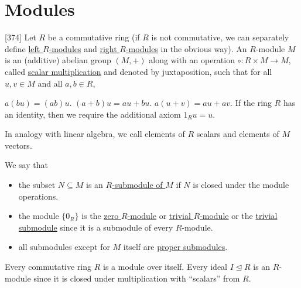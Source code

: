 \section{Modules}\label{sec:modules}

\begin{definition}\label{def:module}\cite{Knapp2016BAlg}[374]
  Let $R$ be a commutative ring (if $R$ is not commutative, we can separately define \uline{left $R$-modules} and \uline{right $R$-modules} in the obvious way). An $R$-module $M$ is an (additive) abelian group $(M, +)$ along with an operation $\circ: R \times M \to M$, called \uline{scalar multiplication} and denoted by juxtaposition, such that for all $u, v \in M$ and all $a, b \in R$,
  \begin{description}
     $a (b u) = (a b) u$.
     $(a + b) u = a u + b u$.
     $a (u + v) = a u + a v$.
     If the ring $R$ has an identity, then we require the additional axiom $1_R u = u$.
  \end{description}

  In analogy with linear algebra, we call elements of $R$ scalars and elements of $M$ vectors.

  We say that
  \begin{itemize}
    \item the subset $N \subseteq M$ is an \uline{$R$-submodule of $M$} if $N$ is closed under the module operations.
    \item the module $\{ 0_R \}$ is the \uline{zero $R$-module} or \uline{trivial $R$-module} or the \uline{trivial submodule} since it is a submodule of every $R$-module.
    \item all submodules except for $M$ itself are \uline{proper submodules}.
  \end{itemize}
\end{definition}

\begin{example}\label{ex:module/ideal}
  Every commutative ring $R$ is a module over itself. Every ideal $I \unlhd R$ is an $R$-module since it is closed under multiplication with \enquote{scalars} from $R$.
\end{example}

